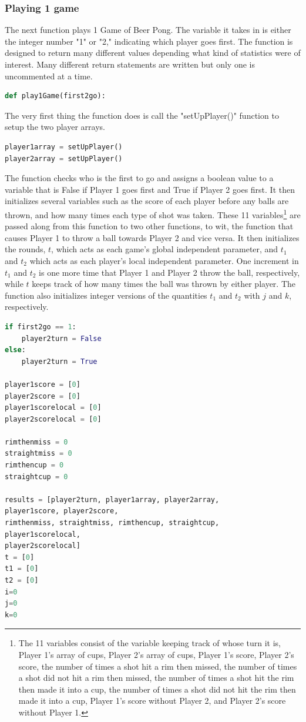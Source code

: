 \documentclass{article}
\begin{document}
\subsubsection{Playing 1 game}
The next function plays 1 Game of Beer Pong. The variable it takes in is either the integer number "1" or "2," indicating which player goes first. The function is designed to return many different values depending what kind of statistics were of interest. Many different return statements are written but only one is uncommented at a time.
\begin{lstlisting}[language=Python]
def play1Game(first2go):
\end{lstlisting}
The very first thing the function does is call the "setUpPlayer()" function to setup the two player arrays.
\begin{lstlisting}[language=Python]
player1array = setUpPlayer()
player2array = setUpPlayer()
\end{lstlisting}
The function checks who is the first to go and assigns a boolean value to a variable that is False if Player 1 goes first and True if Player 2 goes first. It then initializes several variables such as the score of each player before any balls are thrown, and how many times each type of shot was taken. These 11 variables\footnote{The 11 variables consist of the variable keeping track of whose turn it is, Player 1's array of cups, Player 2's array of cups, Player 1's score, Player 2's score, the number of times a shot hit a rim then missed, the number of times a shot did not hit a rim then missed, the number of times a shot hit the rim then made it into a cup, the number of times a shot did not hit the rim then made it into a cup, Player 1's score without Player 2, and Player 2's score without Player 1.} are passed along from this function to two other functions, to wit, the function that causes Player 1 to throw a ball towards Player 2 and vice versa. It then initializes the rounds, $t$, which acts as each game's global independent parameter, and $t_1$ and $t_2$ which acts as each player's local independent parameter. One increment in $t_1$ and $t_2$ is one more time that Player 1 and Player 2 throw the ball, respectively, while $t$ keeps track of how many times the ball was thrown by either player. The function also initializes integer versions of the quantities $t_1$ and $t_2$ with $j$ and $k$, respectively.
\begin{lstlisting}[language=Python]
if first2go == 1:
    player2turn = False
else:
    player2turn = True

player1score = [0]
player2score = [0]
player1scorelocal = [0]
player2scorelocal = [0]

rimthenmiss = 0
straightmiss = 0
rimthencup = 0
straightcup = 0

results = [player2turn, player1array, player2array,
player1score, player2score, 
rimthenmiss, straightmiss, rimthencup, straightcup,
player1scorelocal, 
player2scorelocal]
t = [0]
t1 = [0]
t2 = [0]
i=0
j=0
k=0
\end{lstlisting}
\end{document}
